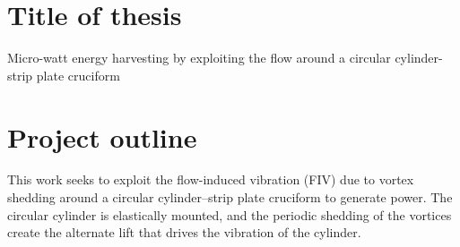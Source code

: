 \documentclass[a4paper]{article}
\begin{document}
\newcommand{\uon}{\unit{0.1}{\metre\per\second}}
\newcommand{\utw}{\unit{0.2}{\metre\per\second}}
\newcommand{\uth}{\unit{0.3}{\metre\per\second}}
\newcommand{\ufo}{\unit{0.4}{\metre\per\second}}
\newcommand{\ufi}{\unit{0.5}{\metre\per\second}}
\newcommand{\usi}{\unit{0.6}{\metre\per\second}}
\newcommand{\use}{\unit{0.7}{\metre\per\second}}
\newcommand{\uei}{\unit{0.8}{\metre\per\second}}
\newcommand{\uni}{\unit{0.9}{\metre\per\second}}
\newcommand{\ute}{\unit{1.0}{\metre\per\second}}
\newcommand{\uel}{\unit{1.1}{\metre\per\second}}
\newcommand{\utv}{\unit{1.2}{\metre\per\second}}
\newcommand{\utt}{\unit{1.3}{\metre\per\second}}

\newcommand{\ptlt}{$\theta_{\text{plate}}$}
\newcommand{\rze}{\unit{0}{\radian}}
\newcommand{\ron}{\unit{\pi/8}{\radian}}
\newcommand{\rtw}{\unit{\pi/4}{\radian}}
\newcommand{\rth}{\unit{3\pi/8}{\radian}}
\newcommand{\rfo}{\unit{\pi/2}{\radian}}

\newcommand{\ypl}{$y^{+}$} %
\newcommand{\ured}{$U^{*}$} %
\newcommand{\yrms}{$y^{*}_{\text{RMS}}$} %

\newcommand{\uron}{$2.3$}
\newcommand{\urtw}{$4.5$}
\newcommand{\urth}{$6.8$}
\newcommand{\urfo}{$9.1$}
\newcommand{\urfi}{$11.4$}
\newcommand{\ursi}{$13.6$}
\newcommand{\urse}{$15.9$}
\newcommand{\urei}{$18.2$}
\newcommand{\urni}{$20.5$}
\newcommand{\urte}{$22.7$}
\newcommand{\urel}{$25.0$}
\newcommand{\urtv}{$27.3$}
\newcommand{\urtt}{$29.5$}

\newcommand{\es}{$=$}
\newcommand{\flrms}{$F_{\text{L,RMS}}$} %

\section{Title of thesis}
Micro-watt energy harvesting by exploiting the flow around a circular cylinder-strip plate cruciform

\section{Project outline} \label{outline}
This work seeks to exploit the flow-induced vibration (FIV) due to vortex shedding around a circular cylinder--strip plate cruciform to generate power. The circular cylinder is elastically mounted, and the periodic shedding of the vortices create the alternate lift that drives the vibration of the cylinder.
\end{document}
